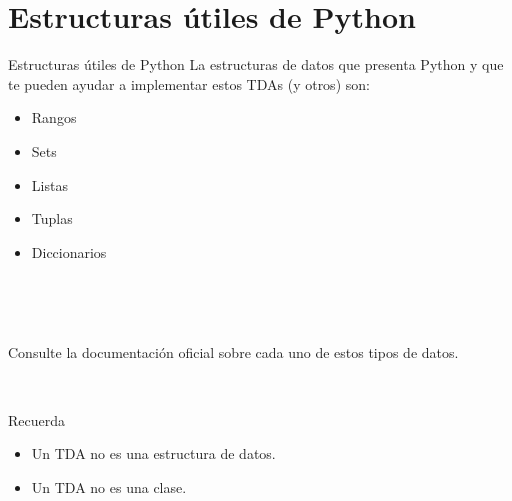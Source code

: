\documentclass[10pt,envcountsect,spanish]{beamer}
\begin{document}
\section{Estructuras útiles de Python}


\begin{frame}{Estructuras útiles de Python}
La estructuras de datos que presenta Python y que te pueden ayudar a implementar estos TDAs (y otros) son:

\begin{itemize}%
\item Rangos
\item Sets
\item Listas
\item Tuplas
\item Diccionarios
\end{itemize}

\


\


Consulte la documentación oficial sobre cada uno de estos tipos de datos.

\

Recuerda 
\begin{itemize}%
\item Un TDA no es una estructura de datos.
\item Un TDA no es una clase.
\end{itemize}


\end{frame}
\end{document}
